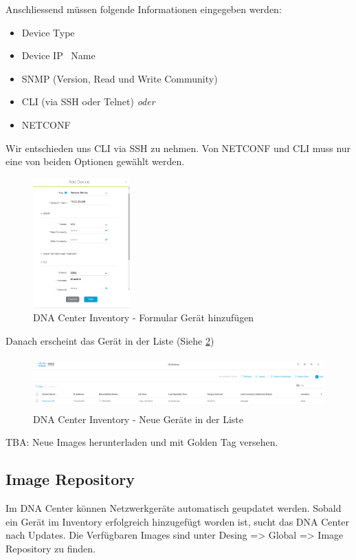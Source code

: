 Anschliessend müssen folgende Informationen eingegeben werden:
\begin{itemize}
	\item Device Type
	\item Device IP \ Name
	\item SNMP (Version, Read und Write Community)
	\item CLI (via SSH oder Telnet) \textit{oder}
	\item NETCONF
\end{itemize}

Wir entschieden uns CLI via SSH zu nehmen. Von NETCONF und CLI muss nur eine von beiden Optionen gewählt werden. 

\begin{figure}[H]
	\centering
	\includegraphics[height=5cm]{img/dna-center-inventory-add-form.png}
	\caption{DNA Center Inventory - Formular Gerät hinzufügen}
	\label{fig:dna-center-inventory-add-form}
\end{figure}

Danach erscheint das Gerät in der Liste (Siehe \ref{fig:dna-center-inventory-index-new})

\begin{figure}[H]
	\centering
	\includegraphics[height=2cm]{img/dna-center-inventory-index-new.png}
	\caption{DNA Center Inventory - Neue Geräte in der Liste}
	\label{fig:dna-center-inventory-index-new}
\end{figure}

TBA: Neue Images herunterladen und mit Golden Tag versehen. 

\subsection{Image Repository}
Im DNA Center können Netzwerkgeräte automatisch geupdatet werden. Sobald ein Gerät im Inventory erfolgreich hinzugefügt worden ist, sucht das DNA Center nach Updates. Die Verfügbaren Images sind unter Desing => Global => Image Repository zu finden.

